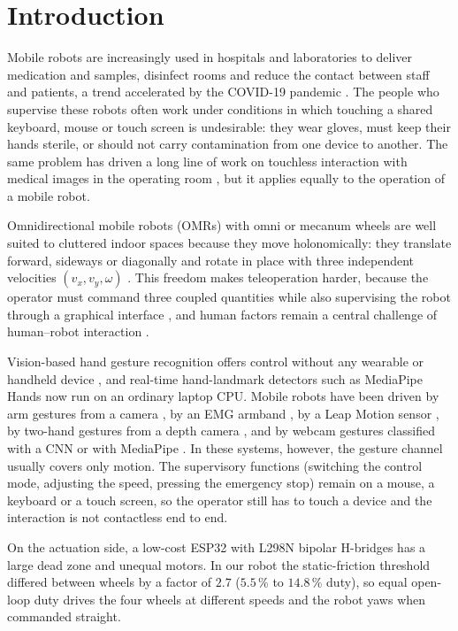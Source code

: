 \documentclass[5p,twocolumn]{elsarticle}
\begin{document}
\section{Introduction}
Mobile robots are increasingly used in hospitals and laboratories to deliver medication and samples, disinfect rooms and reduce the contact between staff and patients, a trend accelerated by the COVID-19 pandemic \cite{yang2020}. The people who supervise these robots often work under conditions in which touching a shared keyboard, mouse or touch screen is undesirable: they wear gloves, must keep their hands sterile, or should not carry contamination from one device to another. The same problem has driven a long line of work on touchless interaction with medical images in the operating room \cite{wachs2008,ohara2014,mewes2017}, but it applies equally to the operation of a mobile robot.

Omnidirectional mobile robots (OMRs) with omni or mecanum wheels are well suited to cluttered indoor spaces because they move holonomically: they translate forward, sideways or diagonally and rotate in place with three independent velocities $(v_x, v_y, \omega)$ \cite{siegwart2011,taheri2015}. This freedom makes teleoperation harder, because the operator must command three coupled quantities while also supervising the robot through a graphical interface \cite{fong2001,chen2007}, and human factors remain a central challenge of human--robot interaction \cite{goodrich2007,sheridan2016}.

Vision-based hand gesture recognition offers control without any wearable or handheld device \cite{mitra2007,wachs2011,rautaray2015,oudah2020}, and real-time hand-landmark detectors such as MediaPipe Hands \cite{zhang2020,lugaresi2019} now run on an ordinary laptop CPU. Mobile robots have been driven by arm gestures from a camera \cite{waldherr2000}, by an EMG armband \cite{bisi2018}, by a Leap Motion sensor \cite{chen2024}, by two-hand gestures from a depth camera \cite{luo2019}, and by webcam gestures classified with a CNN \cite{zaman2023} or with MediaPipe \cite{zick2024}. In these systems, however, the gesture channel usually covers only motion. The supervisory functions (switching the control mode, adjusting the speed, pressing the emergency stop) remain on a mouse, a keyboard or a touch screen, so the operator still has to touch a device and the interaction is not contactless end to end.

On the actuation side, a low-cost ESP32 with L298N bipolar H-bridges has a large dead zone \cite{tao1996} and unequal motors. In our robot the static-friction threshold differed between wheels by a factor of $2.7$ ($5.5\,\%$ to $14.8\,\%$ duty), so equal open-loop duty drives the four wheels at different speeds and the robot yaws when commanded straight.
\end{document}
